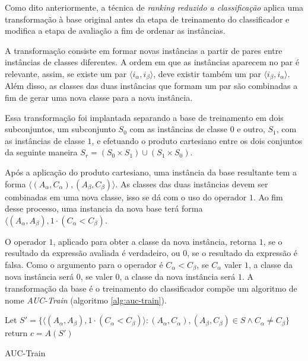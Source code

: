 Como dito anteriormente, a técnica de \emph{ranking reduzido a classificação} aplica uma transformação à base original antes da etapa de treinamento do classificador e modifica a etapa de avaliação a fim de ordenar as instâncias.

A transformação consiste em formar novas instâncias a partir de pares entre instâncias de classes diferentes. A ordem em que as instâncias aparecem no par é relevante, assim, se existe um par $\langle i_\alpha, i_\beta \rangle$, deve existir também um par $\langle i_\beta, i_\alpha \rangle$. Além disso, as classes das duas instâncias que formam um par são combinadas a fim de gerar uma nova classe para a nova instância.

Essa transformação foi implantada separando a base de treinamento em dois subconjuntos, um subconjunto $S_0$ com as instâncias de classe $0$ e outro, $S_1$, com as instâncias de classe $1$, e efetuando o produto cartesiano entre os dois conjuntos da seguinte maneira $S_r = (S_0 \times S_1) \cup (S_1 \times S_0)$.

Após a aplicação do produto cartesiano, uma instância da base resultante tem a forma $\langle (A_\alpha, C_\alpha), (A_\beta, C_\beta) \rangle$. As classes das duas instâncias devem ser combinadas em uma nova classe, isso se dá com o uso do operador $1$. Ao fim desse processo, uma instancia da nova base terá forma $\langle (A_\alpha, A_\beta), 1 \cdot (C_\alpha < C_\beta)$.

O operador $1$, aplicado para obter a classe da nova instância, retorna $1$, se o resultado da expressão avaliada é verdadeiro, ou $0$, se o resultado da expressão é falsa. Como o argumento para o operador é $C_\alpha < C_\beta$, se $C_\alpha$ valer $1$, a classe da nova instância será $0$, se valer $0$, a classe da nova instância será $1$. A transformação da base é o treinamento do classificador compõe um algoritmo de nome \emph{AUC-Train} (algoritmo \ref{alg:auc-train}).

\begin{algorithm}
    \begin{algorithmic}

        \STATE Let $S' = \{\langle (A_\alpha, A_\beta), 1 \cdot (C_\alpha < C_\beta) \rangle : (A_\alpha, C_\alpha), (A_\beta, C_\beta) \in S \wedge C_\alpha \neq C_\beta\}$
        \STATE return $c = A(S')$

        \caption{AUC-Train}
        \label{alg:auc-train}

    \end{algorithmic}
\end{algorithm}

